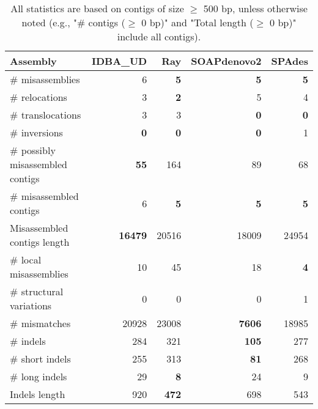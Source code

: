 \documentclass[12pt,a4paper]{article}
\begin{document}
\begin{table}[ht]
\begin{center}
\caption{All statistics are based on contigs of size $\geq$ 500 bp, unless otherwise noted (e.g., "\# contigs ($\geq$ 0 bp)" and "Total length ($\geq$ 0 bp)" include all contigs).}
\begin{tabular}{|l*{4}{|r}|}
\hline
Assembly & IDBA\_UD & Ray & SOAPdenovo2 & SPAdes \\ \hline
\# misassemblies & 6 & {\bf 5} & {\bf 5} & {\bf 5} \\ \hline
\hspace{5mm}\# relocations & 3 & {\bf 2} & 5 & 4 \\ \hline
\hspace{5mm}\# translocations & 3 & 3 & {\bf 0} & {\bf 0} \\ \hline
\hspace{5mm}\# inversions & {\bf 0} & {\bf 0} & {\bf 0} & 1 \\ \hline
\# possibly misassembled contigs & {\bf 55} & 164 & 89 & 68 \\ \hline
\# misassembled contigs & 6 & {\bf 5} & {\bf 5} & {\bf 5} \\ \hline
Misassembled contigs length & {\bf 16479} & 20516 & 18009 & 24954 \\ \hline
\# local misassemblies & 10 & 45 & 18 & {\bf 4} \\ \hline
\# structural variations & 0 & 0 & 0 & 1 \\ \hline
\# mismatches & 20928 & 23008 & {\bf 7606} & 18985 \\ \hline
\# indels & 284 & 321 & {\bf 105} & 277 \\ \hline
\hspace{5mm}\# short indels & 255 & 313 & {\bf 81} & 268 \\ \hline
\hspace{5mm}\# long indels & 29 & {\bf 8} & 24 & 9 \\ \hline
Indels length & 920 & {\bf 472} & 698 & 543 \\ \hline
\end{tabular}
\end{center}
\end{table}
\end{document}
